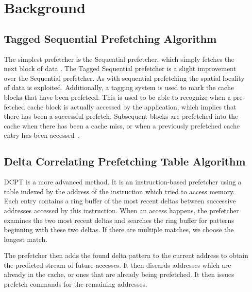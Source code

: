 \section{Background}

\subsection{Tagged Sequential Prefetching Algorithm}

The simplest prefetcher is the Sequential prefetcher, which simply fetches the
next block of data \cite{seq}. The Tagged Sequential prefetcher is a slight
improvement over the Sequential prefetcher. As with sequential prefetching the
spatial locality of data is exploited. Additionally, a tagging system is used to
mark the cache blocks that have been prefetced. This is used to be able to
recognize when a pre-fetched cache block is actually accessed by the
application, which implies that there has been a successful prefetch. Subsequent
blocks are prefetched into the cache when there has been a cache miss, or when a
previously prefetched cache entry has been accessed~\cite{grannæs}.

\subsection{Delta Correlating Prefetching Table Algorithm}

DCPT is a more advanced method. It is an instruction-based prefetcher using a
table indexed by the address of the instruction which tried to access memory.
Each entry contains a ring buffer of the most recent deltas between successive
addresses accessed by this instruction. When an access happens, the prefetcher
examines the two most recent deltas and searches the ring buffer for patterns
beginning with these two deltas. If there are multiple matches, we choose the
longest match.

The prefetcher then adds the found delta pattern to the current address to
obtain the predicted stream of future accesses. It then discards addresses which
are already in the cache, or ones that are already being prefetched. It then
issues prefetch commands for the remaining addresses.

